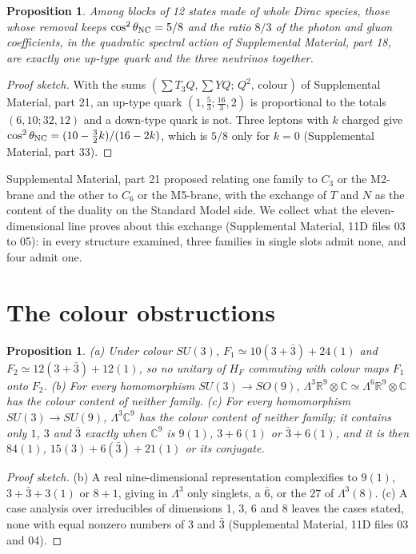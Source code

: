 \documentclass[aps,prd,reprint,onecolumn,nofootinbib,amsmath,amssymb,floatfix]{revtex4-2}
\theoremstyle{plain}
\newtheorem{proposition}[theorem]{Proposition}
\newcommand{\C}{\mathbb C}
\newcommand{\R}{\mathbb R}
\newcommand{\supp}[1]{Supplemental Material, part #1}
\begin{document}
\begin{proposition}\label{prop:blocks}
Among blocks of 12 states made of whole Dirac species, those whose removal keeps $\cos^2\theta_{\rm NC}=5/8$ and the ratio $8/3$ of the photon and gluon coefficients, in the quadratic spectral action of \supp{18}, are exactly one up-type quark and the three neutrinos together.
\end{proposition}

\begin{proof}[Proof sketch]
With the sums $(\sum T_3Q,\sum YQ;\,Q^2,\,\text{colour})$ of \supp{21}, an up-type quark $(1,\frac53;\frac{16}3,2)$ is proportional to the totals $(6,10;32,12)$ and a down-type quark is not. Three leptons with $k$ charged give $\cos^2\theta_{\rm NC}=(10-\frac32k)/(16-2k)$, which is $5/8$ only for $k=0$ (\supp{33}).
\end{proof}

\supp{21} proposed relating one family to $C_3$ or the M2-brane and the other to $C_6$ or the M5-brane, with the exchange of $T$ and $N$ as the content of the duality on the Standard Model side. We collect what the eleven-dimensional line proves about this exchange (Supplemental Material, 11D files 03 to 05): in every structure examined, three families in single slots admit none, and four admit one.

\section{The colour obstructions}\label{sec:colour}

\begin{proposition}\label{prop:colour}
(a) Under colour $SU(3)$, $F_1\simeq10(3+\bar3)+24(1)$ and $F_2\simeq12(3+\bar3)+12(1)$, so no unitary of $H_F$ commuting with colour maps $F_1$ onto $F_2$. (b) For every homomorphism $SU(3)\to SO(9)$, $\Lambda^3\R^9\otimes\C\simeq\Lambda^6\R^9\otimes\C$ has the colour content of neither family. (c) For every homomorphism $SU(3)\to SU(9)$, $\Lambda^3\C^9$ has the colour content of neither family; it contains only $1$, $3$ and $\bar3$ exactly when $\C^9$ is $9(1)$, $3+6(1)$ or $\bar3+6(1)$, and it is then $84(1)$, $15(3)+6(\bar3)+21(1)$ or its conjugate.
\end{proposition}

\begin{proof}[Proof sketch]
(b) A real nine-dimensional representation complexifies to $9(1)$, $3+\bar3+3(1)$ or $8+1$, giving in $\Lambda^3$ only singlets, a $\bar6$, or the $27$ of $\Lambda^3(8)$. (c) A case analysis over irreducibles of dimensions 1, 3, 6 and 8 leaves the cases stated, none with equal nonzero numbers of $3$ and $\bar3$ (Supplemental Material, 11D files 03 and 04).
\end{proof}
\end{document}
